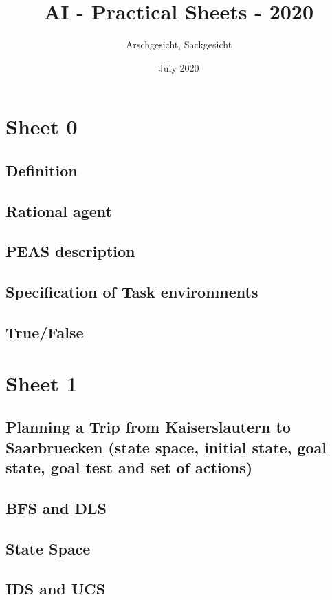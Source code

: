 \documentclass{article}
\title{AI - Practical Sheets - 2020}
\author{Arschgesicht, Sackgesicht}
\date{July 2020}
\begin{document}
\maketitle

\tableofcontents
\newpage

\section{Sheet 0}
    \subsection{Definition}
    \subsection{Rational agent}
    \subsection{PEAS description}
    \subsection{Specification of Task environments}
    \subsection{True/False}
    

\section{Sheet 1}
    \subsection{Planning a Trip from Kaiserslautern to Saarbruecken (state space, initial state, goal state, goal test and set of actions)}
    \subsection{BFS and DLS}
    \subsection{State Space}
    \subsection{IDS and UCS}
    
    
\end{document}
